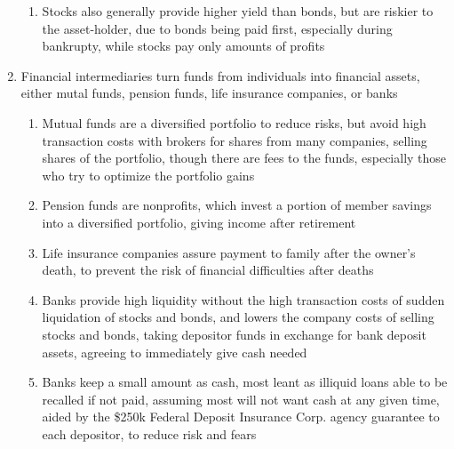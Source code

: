 \documentclass[11 pt, twoside]{article}
\begin{document}
\begin{enumerate}
\begin{enumerate}
\item Stocks also generally provide higher yield than bonds, but are riskier to the asset-holder, due to bonds being paid first, especially during bankrupty,  while stocks pay only amounts of profits
\end{enumerate}
\item Financial intermediaries turn funds from individuals into financial assets, either mutal funds, pension funds, life insurance companies, or banks
\begin{enumerate}
\item Mutual funds are a diversified portfolio to reduce risks, but avoid high transaction costs with brokers for shares from many companies, selling shares of the portfolio, though there are fees to the funds, especially those who try to optimize the portfolio gains
\item Pension funds are nonprofits, which invest a portion of member savings into a diversified portfolio, giving income after retirement
\item Life insurance companies assure payment to family after the owner's death, to prevent the risk of financial difficulties after deaths
\item Banks provide high liquidity without the high transaction costs of sudden liquidation of stocks and bonds, and lowers the company costs of selling stocks and bonds, taking depositor funds in exchange for bank deposit assets, agreeing to immediately give cash needed
\item Banks keep a small amount as cash, most leant as illiquid loans able to be recalled if not paid, assuming most will not want cash at any given time, aided by the \$250k Federal Deposit Insurance Corp. agency guarantee to each depositor, to reduce risk and fears
\end{enumerate}
\end{enumerate}
\end{document}
